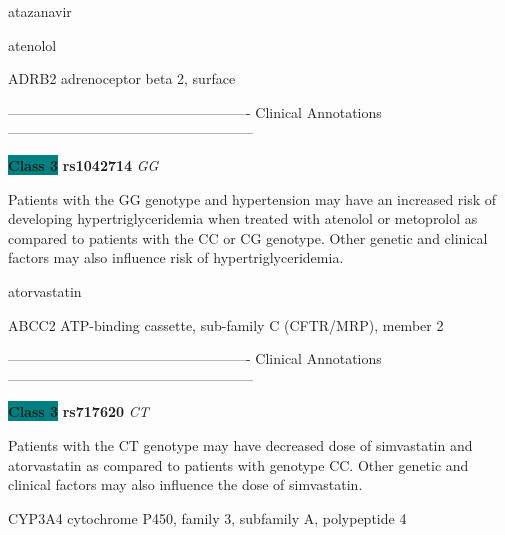 \documentclass{resume} %
\begin{document}
\begin{rSection}{ atazanavir }
\end{rSection}\begin{rSection}{ atenolol }
\item[]

\begin{rSubsection}{ ADRB2 }{ adrenoceptor beta 2, surface }{}{}
\item[]

\item[] ---------------------------------------------------- Clinical Annotations -----------------------------------------------------\newline
\item \textbf{\colorbox{teal} {Class 3}} \textbf{ rs1042714 } \textit{ GG }
\item[] Patients with the GG genotype and hypertension may have an increased risk of developing hypertriglyceridemia when treated with atenolol or metoprolol as compared to patients with the CC or CG genotype. Other genetic and clinical factors may also influence risk of hypertriglyceridemia. 
\end{rSubsection}

\end{rSection}\begin{rSection}{ atorvastatin }
\item[]

\begin{rSubsection}{ ABCC2 }{ ATP-binding cassette, sub-family C (CFTR/MRP), member 2 }{}{}
\item[]

\item[] ---------------------------------------------------- Clinical Annotations -----------------------------------------------------\newline
\item \textbf{\colorbox{teal} {Class 3}} \textbf{ rs717620 } \textit{ CT }
\item[] Patients with the CT genotype may have decreased dose of simvastatin and atorvastatin as compared to patients with genotype CC. Other genetic and clinical factors may also influence the dose of simvastatin.
\end{rSubsection}\begin{rSubsection}{ CYP3A4 }{ cytochrome P450, family 3, subfamily A, polypeptide 4 }{}{}
\item[]


\end{rSubsection}
\end{rSection}
\end{document}
